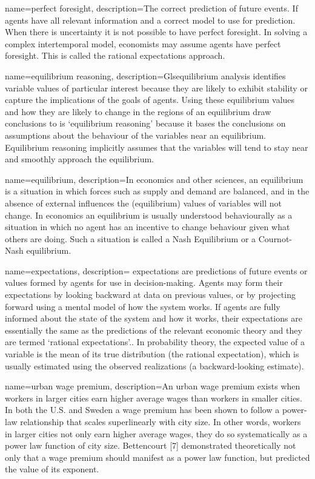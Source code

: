 {
name=perfect foresight,
description={The correct prediction of future events. If agents have  all relevant information and  a correct model to use for prediction. When there is uncertainty it is not possible to have perfect foresight. In solving a complex intertemporal model, economists may assume agents have perfect foresight. This is called the rational expectations approach. }
}

{
name=equilibrium reasoning,
description={Gls{equilibrium} analysis identifies variable values of particular interest because they are likely to exhibit stability or capture the implications of the goals of agents. Using these equilibrium values and how they are likely to change in the regions of an equilibrium draw conclusions to is `equilibrium reasoning' because it bases the conclusions on assumptions about the behaviour of the variables near an equilibrium. Equilibrium reasoning implicitly  assumes that the variables will tend to stay near and smoothly approach the equilibrium.}
}

{
name=equilibrium,
description={In economics and other sciences, an equilibrium is a situation in which forces such as supply and demand are balanced, and in the absence of external influences the (equilibrium) values of variables will not change. In economics an equilibrium is usually understood behaviourally as a situation in which no agent has an incentive to change behaviour given what others are doing. Such a situation is called a Nash Equilibrium or a Cournot-Nash equilibrium.}
}

{
name=expectations,
description={ expectations are predictions of future events or values formed by agents for use in decision-making. Agents may form their expectations by looking backward at data on previous values, or by projecting forward using a mental model of how the system works. If agents are fully informed about the state of the system and how it works, their expectations are essentially the same as the predictions of the relevant economic theory and they are termed `rational expectations'.\cite{muthRationalExpectationsTheory1961}. In probability theory, the expected value of a variable is the mean of its true distribution (the rational expectation), which is usually estimated using the observed realizations (a backward-looking estimate).}
}

{
name=urban wage premium,
description={An urban wage premium exists when workers in larger cities earn higher average wages than workers in smaller cities. In both the U.S.  and Sweden a wage premium has been shown to follow a power-law relationship that scales superlinearly with city size. In other words, workers in larger cities not only earn higher average wages, they do so systematically as a power law function of city size. Bettencourt [7] demonstrated theoretically not only that a wage premium should manifest as a power law function, but predicted the value of its exponent. }
}

